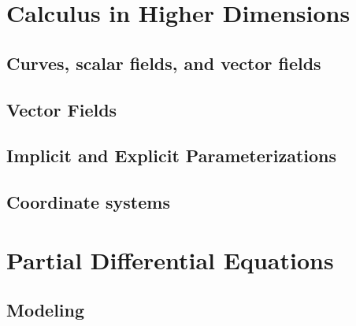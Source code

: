 \documentclass[12pt,letterpaper, openany]{book} %
\begin{document}
 
\frontmatter



%
 
\clearpage
\thispagestyle{empty}
 
\tableofcontents
 
\mainmatter

\setcounter{part}{4}

\part{Calculus in Higher Dimensions}

\chapter{Curves, scalar fields, and vector fields}


\chapter{Vector Fields}


\chapter{Implicit and Explicit Parameterizations}


\chapter{Coordinate systems}



\part{Partial Differential Equations}

\chapter{Modeling}

\end{document}
